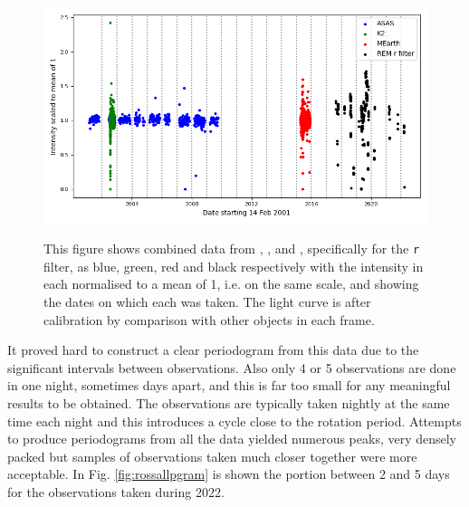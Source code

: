\begin{figure}[!htbp]
\begin{center}
\includegraphics[scale=0.40]{REM/images/comparison.png} \\
\vspace{-.5cm}
\end{center}   
\caption{This figure shows combined data
from \asas, \ktwo, {\MEarth} and \rem, specifically for the \texttt{r} filter,
as blue, green, red and black respectively with the intensity in each normalised
to a mean of 1, i.e. on the same scale, and showing the dates on which each was
taken. The {\rem} light curve is after
calibration by comparison with other objects
in each frame.}\protect\label{fig:allsourcelcurve}
\end{figure}

It proved hard to construct a clear periodogram from this data due to the
significant intervals between observations. Also only 4 or 5 observations are done in one
night, sometimes days apart, and this is far too small for any meaningful
results to be obtained. The observations are typically taken nightly at
the same time each night and this introduces a cycle close to the
rotation period. Attempts to produce periodograms from all the data yielded
numerous peaks, very densely packed but samples of observations taken much
closer together were more acceptable. In Fig.
\ref{fig:rossallpgram} is shown the portion between 2 and 5 days for the observations taken during 2022.

